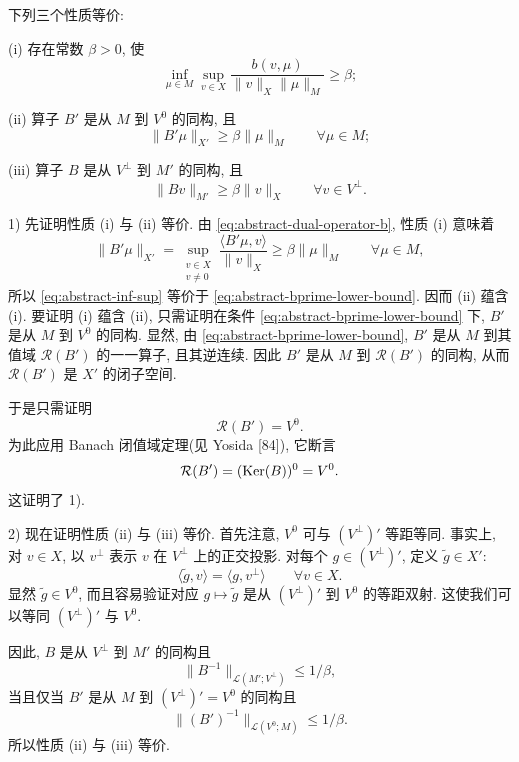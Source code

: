\begin{Lemma}\label{lem:ch4-abstract-div}
下列三个性质等价:

\textup{(i)} 存在常数 $\beta>0$, 使
\begin{equation}\label{eq:abstract-inf-sup}
\inf_{\mu\in M}\sup_{v\in X}
\frac{b(v,\mu)}{\|v\|_X\|\mu\|_M}\ge\beta;
\end{equation}

\textup{(ii)} 算子 $B'$ 是从 $M$ 到 $V^0$ 的同构, 且
\begin{equation}\label{eq:abstract-bprime-lower-bound}
\|B'\mu\|_{X'}\ge\beta\|\mu\|_M
\qquad\forall\mu\in M;
\end{equation}

\textup{(iii)} 算子 $B$ 是从 $V^\perp$ 到 $M'$ 的同构, 且
\begin{equation}\label{eq:abstract-b-lower-bound}
\|Bv\|_{M'}\ge\beta\|v\|_X
\qquad\forall v\in V^\perp.
\end{equation}
\end{Lemma}
\begin{Proof}
1) 先证明性质 (i) 与 (ii) 等价. 由 
\eqref{eq:abstract-dual-operator-b}, 性质 (i) 意味着
\[
\|B'\mu\|_{X'}
=\sup_{\substack{v\in X\\v\ne0}}
\frac{\langle B'\mu,v\rangle}{\|v\|_X}
\ge\beta\|\mu\|_M
\qquad\forall\mu\in M,
\]
所以 
\eqref{eq:abstract-inf-sup} 等价于
\eqref{eq:abstract-bprime-lower-bound}. 因而 (ii) 蕴含 (i).
要证明 (i) 蕴含 (ii), 只需证明在条件
\eqref{eq:abstract-bprime-lower-bound} 下, $B'$ 是从 $M$ 到 $V^0$ 的同构.
显然, 由 
\eqref{eq:abstract-bprime-lower-bound}, $B'$ 是从 $M$ 到其值域
$\mathcal R(B')$ 的一一算子, 且其逆连续. 因此 $B'$ 是从 $M$ 到
$\mathcal R(B')$ 的同构, 从而 $\mathcal R(B')$ 是 $X'$ 的闭子空间.

于是只需证明
\[
\mathcal R(B')=V^0.
\]
为此应用 Banach 闭值域定理(见 Yosida [84]), 它断言
\[
\mathcal R(B')=(\operatorname{Ker}(B))^0=V^0.
\]
这证明了 1).

2) 现在证明性质 (ii) 与 (iii) 等价. 首先注意, $V^0$ 可与
$(V^\perp)'$ 等距等同. 事实上, 对 $v\in X$, 以 $v^\perp$ 表示
$v$ 在 $V^\perp$ 上的正交投影. 对每个 $g\in(V^\perp)'$, 定义
$\widetilde g\in X'$:
\[
\langle\widetilde g,v\rangle=\langle g,v^\perp\rangle
\qquad\forall v\in X.
\]
显然 $\widetilde g\in V^0$, 而且容易验证对应
$g\mapsto\widetilde g$ 是从 $(V^\perp)'$ 到 $V^0$ 的等距双射.
这使我们可以等同 $(V^\perp)'$ 与 $V^0$.

因此, $B$ 是从 $V^\perp$ 到 $M'$ 的同构且
\[
\|B^{-1}\|_{\mathcal L(M';V^\perp)}\le1/\beta,
\]
当且仅当 $B'$ 是从 $M$ 到 $(V^\perp)'=V^0$ 的同构且
\[
\|(B')^{-1}\|_{\mathcal L(V^0;M)}\le1/\beta.
\]
所以性质 (ii) 与 (iii) 等价.
\end{Proof}

